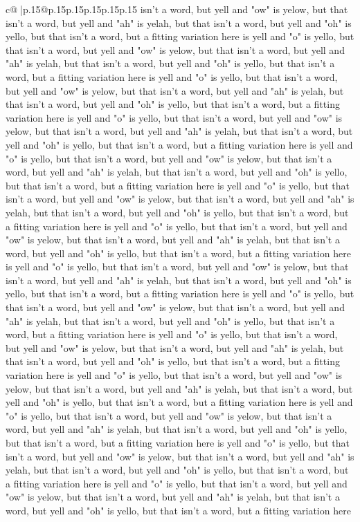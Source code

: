 \documentclass{article}
\begin{document}
{\begin{supertabular}{c@{$\;$}|p{.15\linewidth}@{}p{.15\linewidth}p{.15\linewidth}p{.15\linewidth}p{.15\linewidth}p{.15\linewidth}}
{{{isn't a word, but yell and "ow" is yelow, but that isn't a word, but yell and "ah" is yelah, but that isn't a word, but yell and "oh" is yello, but that isn't a word, but a fitting variation here is yell and "o" is yello, but that isn't a word, but yell and "ow" is yelow, but that isn't a word, but yell and "ah" is yelah, but that isn't a word, but yell and "oh" is yello, but that isn't a word, but a fitting variation here is yell and "o" is yello, but that isn't a word, but yell and "ow" is yelow, but that isn't a word, but yell and "ah" is yelah, but that isn't a word, but yell and "oh" is yello, but that isn't a word, but a fitting variation here is yell and "o" is yello, but that isn't a word, but yell and "ow" is yelow, but that isn't a word, but yell and "ah" is yelah, but that isn't a word, but yell and "oh" is yello, but that isn't a word, but a fitting variation here is yell and "o" is yello, but that isn't a word, but yell and "ow" is yelow, but that isn't a word, but yell and "ah" is yelah, but that isn't a word, but yell and "oh" is yello, but that isn't a word, but a fitting variation here is yell and "o" is yello, but that isn't a word, but yell and "ow" is yelow, but that isn't a word, but yell and "ah" is yelah, but that isn't a word, but yell and "oh" is yello, but that isn't a word, but a fitting variation here is yell and "o" is yello, but that isn't a word, but yell and "ow" is yelow, but that isn't a word, but yell and "ah" is yelah, but that isn't a word, but yell and "oh" is yello, but that isn't a word, but a fitting variation here is yell and "o" is yello, but that isn't a word, but yell and "ow" is yelow, but that isn't a word, but yell and "ah" is yelah, but that isn't a word, but yell and "oh" is yello, but that isn't a word, but a fitting variation here is yell and "o" is yello, but that isn't a word, but yell and "ow" is yelow, but that isn't a word, but yell and "ah" is yelah, but that isn't a word, but yell and "oh" is yello, but that isn't a word, but a fitting variation here is yell and "o" is yello, but that isn't a word, but yell and "ow" is yelow, but that isn't a word, but yell and "ah" is yelah, but that isn't a word, but yell and "oh" is yello, but that isn't a word, but a fitting variation here is yell and "o" is yello, but that isn't a word, but yell and "ow" is yelow, but that isn't a word, but yell and "ah" is yelah, but that isn't a word, but yell and "oh" is yello, but that isn't a word, but a fitting variation here is yell and "o" is yello, but that isn't a word, but yell and "ow" is yelow, but that isn't a word, but yell and "ah" is yelah, but that isn't a word, but yell and "oh" is yello, but that isn't a word, but a fitting variation here is yell and "o" is yello, but that isn't a word, but yell and "ow" is yelow, but that isn't a word, but yell and "ah" is yelah, but that isn't a word, but yell and "oh" is yello, but that isn't a word, but a fitting variation here is yell and "o" is yello, but that isn't a word, but yell and "ow" is yelow, but that isn't a word, but yell and "ah" is yelah, but that isn't a word, but yell and "oh" is yello, but that isn't a word, but a fitting variation here }}}
\end{supertabular}}
\end{document}
